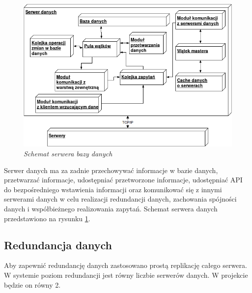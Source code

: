\begin{figure}[!h]
    \begin{center}
    \includegraphics[angle=0,scale=0.6]{img/data_serv.png}
    \end{center}
    \caption{\em Schemat serwera bazy danych}
    \label{fig:db}
\end{figure}

Serwer danych ma za zadnie przechowywać informacje w bazie danych, przetwarzać informacje, udostępniać przetworzone informacje, udostępniać API do bezpośredniego wstawienia informacji oraz komunikować się z innymi serwerami danych w celu realizacji redundancji danych, zachowania spójności danych i współbieżnego realizowania zapytań. Schemat serwera danych przedstawiono na rysunku \ref{fig:db}.

\subsection{Redundancja danych}
Aby zapewnić redundancję danych zastosowano prostą replikację całego serwera. W systemie poziom redundancji jest równy liczbie serwerów danych. W projekcie będzie on równy 2.
